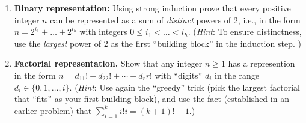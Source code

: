 \begin{enumerate}
\begin{enumerate}

\item \textbf{Binary representation:}
Using strong induction prove that every positive integer $n$ can be
represented as a sum of \emph{distinct} powers of $2$, i.e., in the form
$n=2^{i_1}+\dots + 2^{i_h}$ with integers $0\le i_1<\dots < i_h$.
(\emph{Hint}: To ensure distinctness, use the \emph{largest} 
power of $2$ as the first ``building block'' in the induction step.
)


\item
\textbf{Factorial representation.}
Show that any integer $n\ge1$ has a  represention in the form
$n=d_11!+d_22!+\cdots+d_rr!$
with ``digits'' $d_i$ in the range $d_i\in\{0,1,\dots,i\}$.
(\emph{Hint}: Use again the ``greedy'' trick (pick the largest factorial that ``fits'' 
as your first building block), and use the 
fact (established in an earlier problem) that
$\sum_{i=1}^ki!i=(k+1)!-1$.)


\end{enumerate}



\end{enumerate}
